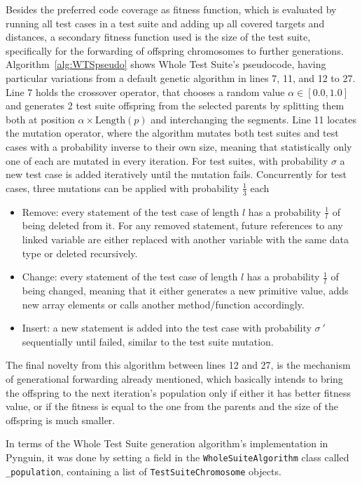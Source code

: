 \documentclass[%
  chapterprefix=false,%
  open=right,%
  twoside=true,%
  paper=a4,%
  logofile={Figures/logo.png},%
  thesistype=master,%
  UKenglish,%
]{se2thesis}
\newcommand{\classname}[1]{\texttt{#1}}
\newcommand{\field}[1]{\texttt{#1}}
\begin{document}
Besides the preferred code coverage as fitness function, which is evaluated by running all test cases in a test suite and adding up all covered targets and distances, a secondary fitness function used is the size of the test suite, specifically for the forwarding of offspring chromosomes to further generations.
Algorithm~\ref{alg:WTSpseudo} shows Whole Test Suite's pseudocode, having particular variations from a default genetic algorithm in lines 7, 11, and 12 to 27.
Line 7 holds the crossover operator, that chooses a random value \(\alpha \in [0.0, 1.0]\) and generates 2 test suite offspring from the selected parents by splitting them both at position \(\alpha \times \text{Length}(p)\) and interchanging the segments.
Line 11 locates the mutation operator, where the algorithm mutates both test suites and test cases with a probability inverse to their own size, meaning that statistically only one of each are mutated in every iteration.
For test suites, with probability \(\sigma\) a new test case is added iteratively until the mutation fails.
Concurrently for test cases, three mutations can be applied with probability \(\frac{1}{3}\) each
\begin{itemize}
  \item Remove: every statement of the test case of length \(l\) has a probability \(\frac{1}{l}\) of being deleted from it. For any removed statement, future references to any linked variable are either replaced with another variable with the same data type or deleted recursively.
  \item Change: every statement of the test case of length \(l\) has a probability \(\frac{1}{l}\) of being changed, meaning that it either generates a new primitive value, adds new array elements or calls another method/function accordingly.
  \item Insert: a new statement is added into the test case with probability \(\sigma~'\) sequentially until failed, similar to the test suite mutation.
\end{itemize}
The final novelty from this algorithm between lines 12 and 27, is the mechanism of generational forwarding already mentioned, which basically intends to bring the offspring to the next iteration's population only if either it has better fitness value, or if the fitness is equal to the one from the parents and the size of the offspring is much smaller.

In terms of the Whole Test Suite generation algorithm's implementation in Pynguin, it was done by setting a field in the \classname{WholeSuiteAlgorithm} class called \field{\_population}, containing a list of \classname{TestSuiteChromosome} objects.
\end{document}
